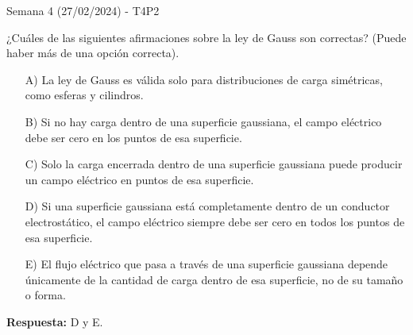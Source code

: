 \begin{frame}{Semana 4 (27/02/2024) - T4P2}
    
    ¿Cuáles de las siguientes afirmaciones sobre la ley de Gauss son correctas? (Puede haber más de una opción correcta).
    
    \begin{itemize}
        \item[A)] La ley de Gauss es válida solo para distribuciones de carga simétricas, como esferas y cilindros.

        \item[B)] Si no hay carga dentro de una superficie gaussiana, el campo eléctrico debe ser cero en los puntos de esa superficie.
        
        \item[C)] Solo la carga encerrada dentro de una superficie gaussiana puede producir un campo eléctrico en puntos de esa superficie.
        
        \item[D)] Si una superficie gaussiana está completamente dentro de un conductor electrostático, el campo eléctrico siempre debe ser cero en todos los puntos de esa superficie.
        
        \item[E)] El flujo eléctrico que pasa a través de una superficie gaussiana depende únicamente de la cantidad de carga dentro de esa superficie, no de su tamaño o forma.
    \end{itemize}
    
    \pause\bigskip\centering\textbf{Respuesta:} D y E.
    
\end{frame}

